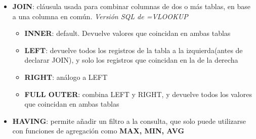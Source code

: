 \begin{itemize}
    \item {\textbf{JOIN}: cláusula usada para combinar columnas de dos o más tablas, en base a una columna en común. \textit{Versión SQL de =VLOOKUP}
    \begin{itemize}
        \item {\textbf{INNER}: default. Devuelve valores que coincidan en ambas tablas}
        \item {\textbf{LEFT}: devuelve todos los registros de la tabla a la izquierda(antes de declarar JOIN), y solo los registros que coincidan en la de la derecha}
        \item {\textbf{RIGHT}: análogo a LEFT}
        \item {\textbf{FULL OUTER}: combina LEFT y RIGHT, y devuelve todos los valores que coincidan en ambas tablas}    
    \end{itemize}}
    \item {\textbf{HAVING}: permite añadir un filtro a la consulta, que solo puede utilizarse con funciones de agregación como \textbf{MAX, MIN, AVG}}
\end{itemize}

